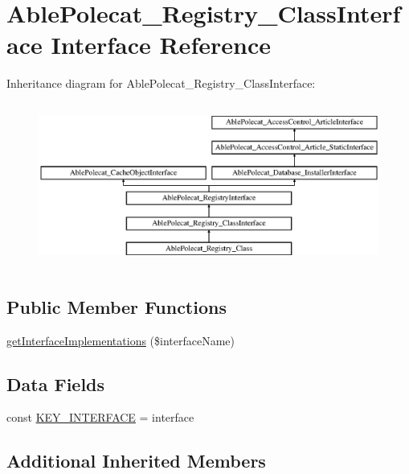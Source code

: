 \hypertarget{interface_able_polecat___registry___class_interface}{}\section{Able\+Polecat\+\_\+\+Registry\+\_\+\+Class\+Interface Interface Reference}
\label{interface_able_polecat___registry___class_interface}
Inheritance diagram for Able\+Polecat\+\_\+\+Registry\+\_\+\+Class\+Interface\+:\begin{figure}[H]
\begin{center}
\leavevmode
\includegraphics[height=5.419355cm]{interface_able_polecat___registry___class_interface}
\end{center}
\end{figure}
\subsection*{Public Member Functions}
\begin{DoxyCompactItemize}
\item 
\hyperlink{interface_able_polecat___registry___class_interface_a3dc91cfd5871e7d3088bcb5a6b22f08a}{get\+Interface\+Implementations} (\$interface\+Name)
\end{DoxyCompactItemize}
\subsection*{Data Fields}
\begin{DoxyCompactItemize}
\item 
const \hyperlink{interface_able_polecat___registry___class_interface_ac0399ea0e4f58ad953bae088a1710c3c}{K\+E\+Y\+\_\+\+I\+N\+T\+E\+R\+F\+A\+C\+E} = \textquotesingle{}interface\textquotesingle{}
\end{DoxyCompactItemize}
\subsection*{Additional Inherited Members}


